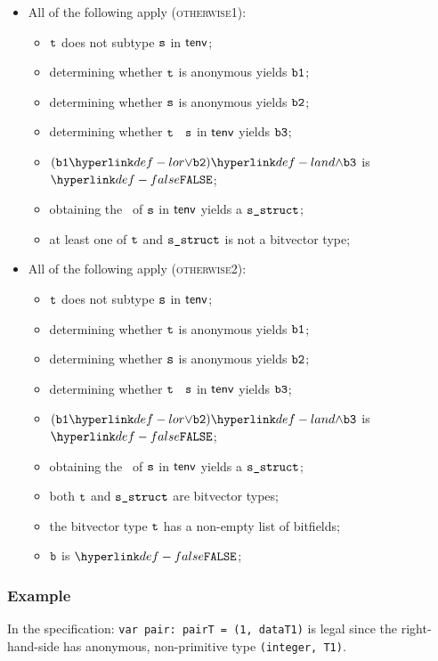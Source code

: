 \begin{itemize}
  \item All of the following apply (\textsc{otherwise1}):
  \begin{itemize}
    \item $\texttt{t}$ does not subtype $\texttt{s}$ in $\textsf{tenv}$;
    \item determining whether $\texttt{t}$ is anonymous yields $\texttt{b1}$;
    \item determining whether $\texttt{s}$ is anonymous yields $\texttt{b2}$;
    \item determining whether $\texttt{t}$ \subtypesatisfies\ $\texttt{s}$ in $\textsf{tenv}$ yields $\texttt{b3}$;
    \item $(\vbone \lor \vbtwo) \land \vbthree$ is $\False$;
    \item obtaining the \structure\ of $\texttt{s}$ in $\textsf{tenv}$ yields a $\texttt{s\_struct}$\ProseOrTypeError;
    \item at least one of $\texttt{t}$ and $\texttt{s\_struct}$ is not a bitvector type;
  \end{itemize}

  \item All of the following apply (\textsc{otherwise2}):
  \begin{itemize}
    \item $\texttt{t}$ does not subtype $\texttt{s}$ in $\textsf{tenv}$;
    \item determining whether $\texttt{t}$ is anonymous yields $\texttt{b1}$;
    \item determining whether $\texttt{s}$ is anonymous yields $\texttt{b2}$;
    \item determining whether $\texttt{t}$ \subtypesatisfies\ $\texttt{s}$ in $\textsf{tenv}$ yields $\texttt{b3}$;
    \item $(\vbone \lor \vbtwo) \land \vbthree$ is $\False$;
    \item obtaining the \structure\ of $\texttt{s}$ in $\textsf{tenv}$ yields a $\texttt{s\_struct}$\ProseOrTypeError;
    \item both $\texttt{t}$ and $\texttt{s\_struct}$ are bitvector types;
    \item the bitvector type $\texttt{t}$ has a non-empty list of bitfields;
    \item $\texttt{b}$ is $\False$;
  \end{itemize}
\end{itemize}

\subsubsection{Example}
In the specification:
\texttt{var pair: pairT = (1, dataT1)} is legal since the right-hand-side has
anonymous, non-primitive type \texttt{(integer, T1)}.

